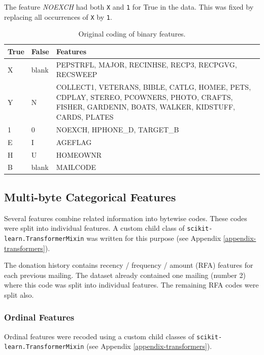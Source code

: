 \documentclass[
  11pt,
  a4paper,
  DIV=12,captions=tableheading,oneside]{scrbook}
\begin{document}
The feature \emph{NOEXCH} had both \texttt{X} and \texttt{1} for True in the data. This was fixed by replacing all occurrences of \texttt{X} by \texttt{1}.

\begin{table}[!h]

\caption{\label{tab:binary-recode}Original coding of binary features.}
\centering
\begin{tabular}{ll>{\raggedright\arraybackslash}p{10cm}}
\toprule
True & False & Features\\
\midrule
X & blank & PEPSTRFL, MAJOR, RECINHSE, RECP3, RECPGVG, RECSWEEP\\
Y & N & COLLECT1, VETERANS, BIBLE, CATLG, HOMEE, PETS, CDPLAY, STEREO,
      PCOWNERS, PHOTO, CRAFTS, FISHER, GARDENIN,  BOATS, WALKER, KIDSTUFF,
      CARDS, PLATES\\
1 & 0 & NOEXCH, HPHONE\_D, TARGET\_B\\
E & I & AGEFLAG\\
H & U & HOMEOWNR\\
\addlinespace
B & blank & MAILCODE\\
\bottomrule
\end{tabular}
\end{table}

\hypertarget{multi-byte-categorical-features}{%
\subsection{Multi-byte Categorical Features}\label{multi-byte-categorical-features}}

Several features combine related information into bytewise codes. These codes were split into individual features. A custom child class of \texttt{scikit-learn.TransformerMixin} was written for this purpose (see Appendix \ref{appendix-transformers}).

The donation history contains recency / frequency / amount (RFA) features for each previous mailing. The dataset already contained one mailing (number 2) where this code was split into individual features. The remaining RFA codes were split also.

\hypertarget{ordinal-features}{%
\subsubsection{Ordinal Features}\label{ordinal-features}}

Ordinal features were recoded using a custom child classes of \texttt{scikit-learn.TransformerMixin} (see Appendix \ref{appendix-transformers}).
\end{document}
